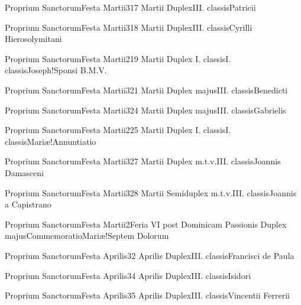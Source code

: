 \documentclass[psalterium-feriale.tex]{subfiles}
\begin{document}
	{Proprium Sanctorum}{Festa Martii}{3}{17 Martii}
	{Duplex}{III. classis}{Patricii}
	{}
	{}
\COPObRubric

	{Proprium Sanctorum}{Festa Martii}{3}{18 Martii}
	{Duplex}{III. classis}{Cyrilli Hierosolymitani}
	{}
	{}
\COPOcRubric

	{Proprium Sanctorum}{Festa Martii}{2}{19 Martii}
	{Duplex I. classis}{I. classis}{Joseph!Sponsi B.M.V.}
	{}
	{}
\psalmodiapropria

	{Proprium Sanctorum}{Festa Martii}{3}{21 Martii}
	{Duplex majus}{III. classis}{Benedicti}
	{}
	{}
\COPOcRubric

	{Proprium Sanctorum}{Festa Martii}{3}{24 Martii}
	{Duplex majus}{III. classis}{Gabrielis}
	{}
	{}
\psalmodiapropria

	{Proprium Sanctorum}{Festa Martii}{2}{25 Martii}
	{Duplex I. classis}{I. classis}{Mariæ!Annuntiatio}
	{}
	{}
\psalmodiapropria

	{Proprium Sanctorum}{Festa Martii}{3}{27 Martii}
	{Duplex m.t.v.}{III. classis}{Joannis Damasceni}
	{}
	{}
\COPObRubric

	{Proprium Sanctorum}{Festa Martii}{3}{28 Martii}
	{Semiduplex m.t.v.}{III. classis}{Joannis a Capistrano}
	{}
	{}
\COPOaRubric

	{Proprium Sanctorum}{Festa Martii}{2}{Feria VI post Dominicam Passionis}
	{Duplex majus}{Commemoratio}{Mariæ!Septem Dolorum}
	{}
	{}
\psalmodiapropria

	{Proprium Sanctorum}{Festa Aprilis}{3}{2 Aprilis}
	{Duplex}{III. classis}{Francisci de Paula}
	{}
	{}
\COPObdRubric

	{Proprium Sanctorum}{Festa Aprilis}{3}{4 Aprilis}
	{Duplex}{III. classis}{Isidori}
	{}
	{}
\COPOcdRubric

	{Proprium Sanctorum}{Festa Aprilis}{3}{5 Aprilis}
	{Duplex}{III. classis}{Vincentii Ferrerii}
	{}
	{}
\COPObdRubric
\end{document}
